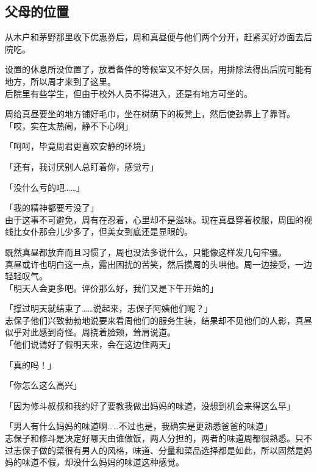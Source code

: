 \subsection{父母的位置}

从木户和茅野那里收下优惠券后，周和真昼便与他们两个分开，赶紧买好炒面去后院吃。

设置的休息所没位置了，放着备件的等候室又不好久居，用排除法得出后院可能有地方，所以周才来到了这里。\\

后院里有些学生，但由于校外人员不得进入，还是有地方可坐的。

周给真昼要坐的地方铺好毛巾，坐在树荫下的板凳上，然后使劲靠上了靠背。\\

「哎，实在太热闹，静不下心啊」

「呵呵，毕竟周君更喜欢安静的环境」

「还有，我讨厌别人总盯着你，感觉亏」

「没什么亏的吧……」

「我的精神都要亏没了」\\

由于这事不可避免，周有在忍着，心里却不是滋味。现在真昼穿着校服，周围的视线比女仆那会儿少多了，但美女到底还是显眼的。

既然真昼都放弃而且习惯了，周也没法多说什么，只能像这样发几句牢骚。\\

真昼或许也明白这一点，露出困扰的苦笑，然后摸周的头哄他。周一边接受，一边轻轻叹气。\\

「明天人会更多吧。评价那么好，我们又是下午开始的」

「撑过明天就结束了……说起来，志保子阿姨他们呢？」\\

志保子他们兴致勃勃地说要来看周他们的服务生装，结果却不见他们的人影，真昼似乎对此感到奇怪。周挠着脸颊，耸肩说道。\\

「他们说请好了假明天来，会在这边住两天」

「真的吗！」

「你怎么这么高兴」

「因为修斗叔叔和我约好了要教我做出妈妈的味道，没想到机会来得这么早」

「男人有什么妈妈的味道啊……不过也是，我确实是更熟悉爸爸的味道」\\

志保子和修斗是决定好哪天由谁做饭，两人分担的，两者的味道周都很熟悉。只不过志保子做的菜很有男人的风格，味道、分量和菜品选择都是如此，所以固然是妈妈的味道不假，却没什么妈妈的味道这种感觉。

